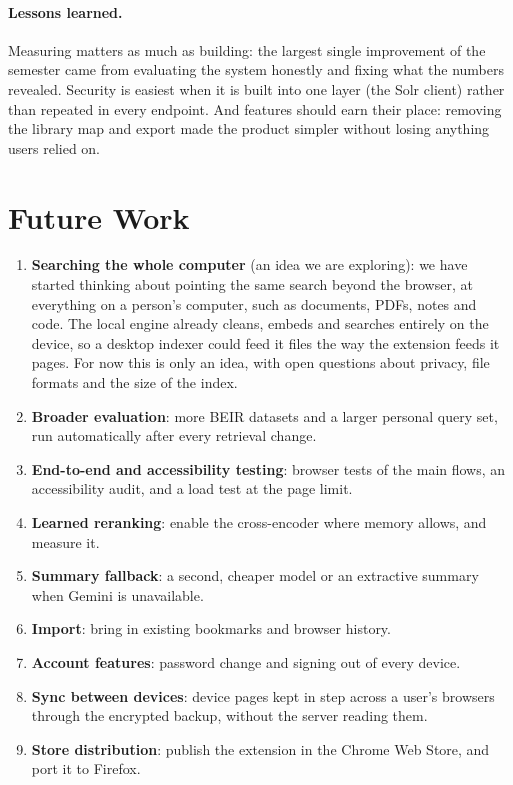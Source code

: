 \paragraph{Lessons learned.} Measuring matters as much as building: the
largest single improvement of the semester came from evaluating the system
honestly and fixing what the numbers revealed. Security is easiest when it is
built into one layer (the Solr client) rather than repeated in every endpoint.
And features should earn their place: removing the library map and export made
the product simpler without losing anything users relied on.

\section{Future Work}
\label{sec:future}

\begin{enumerate}
  \item \textbf{Searching the whole computer} (an idea we are exploring): we
  have started thinking about pointing the same search beyond the browser, at
  everything on a person's computer, such as documents, PDFs, notes and code.
  The local engine already cleans, embeds and searches entirely on the device,
  so a desktop indexer could feed it files the way the extension feeds it
  pages. For now this is only an idea, with open questions about privacy,
  file formats and the size of the index.
  \item \textbf{Broader evaluation}: more BEIR datasets and a larger personal
  query set, run automatically after every retrieval change.
  \item \textbf{End-to-end and accessibility testing}: browser tests of the
  main flows, an accessibility audit, and a load test at the page limit.
  \item \textbf{Learned reranking}: enable the cross-encoder where memory
  allows, and measure it.
  \item \textbf{Summary fallback}: a second, cheaper model or an extractive
  summary when Gemini is unavailable.
  \item \textbf{Import}: bring in existing bookmarks and browser history.
  \item \textbf{Account features}: password change and signing out of every
  device.
  \item \textbf{Sync between devices}: device pages kept in step across a
  user's browsers through the encrypted backup, without the server reading them.
  \item \textbf{Store distribution}: publish the extension in the Chrome Web
  Store, and port it to Firefox.
\end{enumerate}
